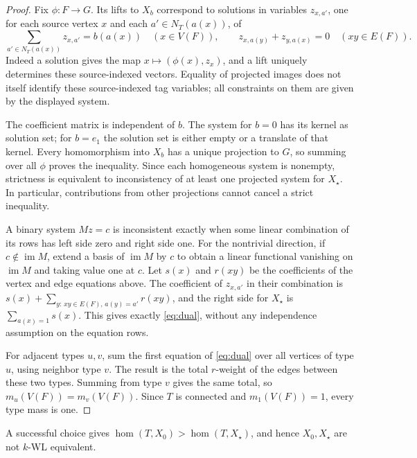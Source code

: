 \begin{proof}
Fix \(\phi:F\to G\). Its lifts to \(X_b\) correspond to solutions in
variables \(z_{x,a'}\), one for each source vertex \(x\) and each
\(a'\in N_T(a(x))\), of
\[
 \sum_{a'\in N_T(a(x))}z_{x,a'}=b(a(x))
 \quad(x\in V(F)),\qquad
 z_{x,a(y)}+z_{y,a(x)}=0
 \quad(xy\in E(F)).
\]
Indeed a solution gives the map \(x\mapsto(\phi(x),z_x)\), and a lift
uniquely determines these source-indexed vectors.
Equality of projected images does not itself identify these
source-indexed tag variables; all constraints on them are given by
the displayed system.

The coefficient matrix is independent of \(b\). The system for \(b=0\)
has its kernel as solution set; for \(b=e_1\) the solution set is
either empty or a translate of that kernel. Every homomorphism into
\(X_b\) has a unique projection to \(G\), so summing over all \(\phi\)
proves the inequality. Since each homogeneous system is nonempty,
strictness is equivalent to inconsistency of at least one projected
system for \(X_\star\). In particular, contributions from other
projections cannot cancel a strict inequality.

A binary system \(Mz=c\) is inconsistent exactly when some linear
combination of its rows has left side zero and right side one.
For the nontrivial direction, if \(c\notin\operatorname{im}M\), extend
a basis of \(\operatorname{im}M\) by \(c\) to obtain a linear functional
vanishing on \(\operatorname{im}M\) and taking value one at \(c\).
Let \(s(x)\) and \(r(xy)\) be the coefficients of the vertex and edge
equations above. The coefficient of \(z_{x,a'}\) in their combination is
\(s(x)+\sum_{y:\,xy\in E(F),\,a(y)=a'}r(xy)\),
and the right side for \(X_\star\) is \(\sum_{a(x)=1}s(x)\).
This gives exactly \eqref{eq:dual}, without any independence assumption
on the equation rows.

For adjacent types \(u,v\), sum the first equation of
\eqref{eq:dual} over all vertices of type \(u\), using neighbor type
\(v\). The result is the total \(r\)-weight of the edges between these
two types. Summing from type \(v\) gives the same total, so
\(m_u(V(F))=m_v(V(F))\). Since \(T\) is connected and
\(m_1(V(F))=1\), every type mass is one.
\end{proof}

\begin{lemma}\label{lem:choice-witness}
A successful choice gives
\(\hom(T,X_0)>\hom(T,X_\star)\), and hence \(X_0,X_\star\)
are not \(k\)-WL equivalent.
\end{lemma}

